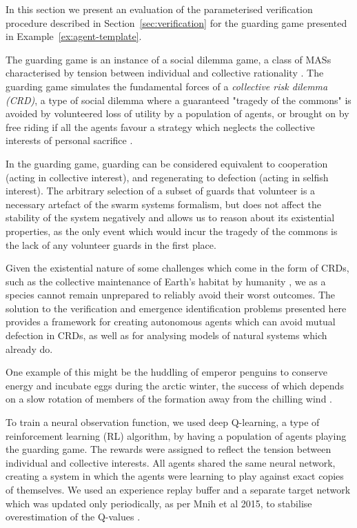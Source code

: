 
In this section we present an evaluation of the parameterised verification
procedure described in Section~\ref{sec:verification} for the guarding game
presented in Example~\ref{ex:agent-template}.


The guarding game is an instance of a social dilemma game, a class of
MASs characterised by tension between individual
and collective rationality \cite{VanlangeJPV13}. The guarding game simulates
the fundamental forces of a \emph{collective risk dilemma (CRD)}, a type of
social dilemma where a guaranteed "tragedy of the commons"
\cite{Hardin68} is avoided by volunteered loss of utility by a population of
agents, or brought on by free riding if all the agents favour a strategy which
neglects the collective interests of personal sacrifice \cite{SantosP11}.

In the guarding game, guarding can be considered equivalent to cooperation
(acting in collective interest), and regenerating to defection (acting in
selfish interest). The arbitrary selection of a subset of guards that volunteer
is a necessary artefact of the swarm systems formalism, but does not affect the
stability of the system negatively and allows us to reason about its
existential properties, as the only event which would incur the tragedy of the
commons is the lack of any volunteer guards in the first place.

Given the existential nature of some challenges which come in the form of CRDs,
such as the collective maintenance of Earth's habitat by humanity
\cite{Smirnov19}, we as a species cannot remain unprepared to reliably avoid
their worst outcomes. The solution to the verification and
emergence identification problems presented here
provides a framework for creating autonomous agents which can avoid mutual
defection in CRDs, as well as for analysing models of natural systems which
already do.

One example of this might be the huddling of emperor penguins to conserve
energy and incubate eggs \cite{GilbertRLNA06} during the
arctic winter, the success of which depends on a slow rotation of members of
the formation away from the chilling wind \cite{WatersBK12}.

To train a neural observation function, we used deep Q-learning, a type of
reinforcement learning (RL) algorithm, by having a population of agents playing
the guarding game. The rewards were assigned to
reflect the tension between individual and collective interests. All agents
shared the same neural network, creating a system in which the agents were
learning to play against exact copies of themselves. We
used an experience replay buffer and a separate target network which
was updated only periodically, as per Mnih et al 2015, to stabilise
overestimation of the Q-values \cite{Mnih+15,HaaseltGS16}.

